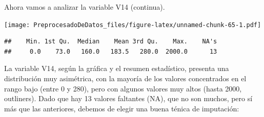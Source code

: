 \documentclass[
]{article}
\newenvironment{Shaded}{\begin{snugshade}}{\end{snugshade}}
\newcommand{\AttributeTok}[1]{\textcolor[rgb]{0.13,0.29,0.53}{#1}}
\newcommand{\CommentTok}[1]{\textcolor[rgb]{0.56,0.35,0.01}{\textit{#1}}}
\newcommand{\DecValTok}[1]{\textcolor[rgb]{0.00,0.00,0.81}{#1}}
\newcommand{\FloatTok}[1]{\textcolor[rgb]{0.00,0.00,0.81}{#1}}
\newcommand{\FunctionTok}[1]{\textcolor[rgb]{0.13,0.29,0.53}{\textbf{#1}}}
\newcommand{\NormalTok}[1]{#1}
\newcommand{\SpecialCharTok}[1]{\textcolor[rgb]{0.81,0.36,0.00}{\textbf{#1}}}
\newcommand{\StringTok}[1]{\textcolor[rgb]{0.31,0.60,0.02}{#1}}
\begin{document}
Ahora vamos a analizar la variable V14 (continua).

\begin{Shaded}
\end{Shaded}

\texttt{[image: PreprocesadoDeDatos\_files/figure-latex/unnamed-chunk-65-1.pdf]}

\begin{Shaded}
\end{Shaded}

\begin{verbatim}
##    Min. 1st Qu.  Median    Mean 3rd Qu.    Max.    NA's 
##     0.0    73.0   160.0   183.5   280.0  2000.0      13
\end{verbatim}

La variable V14, según la gráfica y el resumen estadístico, presenta una
distribución muy asimétrica, con la mayoría de los valores concentrados
en el rango bajo (entre 0 y 280), pero con algunos valores muy altos
(hasta 2000, outliners). Dado que hay 13 valores faltantes (NA), que no
son muchos, pero sí más que las anteriores, debemos de elegir una buena
ténica de imputación:
\end{document}
